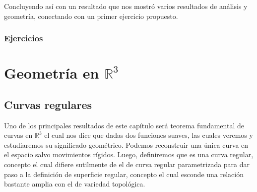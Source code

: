 \documentclass[oneside,11pt]{memoir}
\begin{document}
Concluyendo así con un resultado que nos mostró varios resultados de análisis y geometría, conectando con un primer ejercicio propuesto.
\section{Ejercicios}

\part{Geometría en $\mathbb{R}^3$}
\chapter{Curvas regulares}
Uno de los principales resultados de este capítulo será teorema fundamental de curvas en $\mathbb{R}^3$ el cual nos dice que dadas dos funciones suaves, las cuales veremos y estudiaremos su significado geométrico. Podemos reconstruir una única curva en el espacio salvo movimientos rígidos. Luego, definiremos que es una curva regular, concepto el cual difiere sutilmente de el de curva regular parametrizada para dar paso a la definición de superficie regular, concepto el cual esconde una relación bastante amplia con el de variedad topológica.
\end{document}
